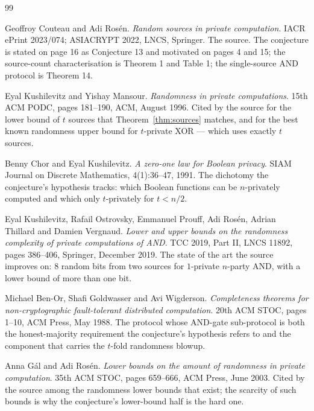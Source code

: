 \documentclass{aicr-conjecture}
\begin{document}
\begin{aicrbibliography}{99}

Geoffroy Couteau and Adi Ros\'en.
\emph{Random sources in private computation}.
IACR ePrint 2023/074; ASIACRYPT 2022, LNCS, Springer.
The source. The conjecture is stated on page 16 as Conjecture 13 and
motivated on pages 4 and 15; the source-count characterisation is
Theorem 1 and Table 1; the single-source AND protocol is Theorem 14.

Eyal Kushilevitz and Yishay Mansour.
\emph{Randomness in private computations}.
15th ACM PODC, pages 181--190, ACM, August 1996.
Cited by the source for the lower bound of $t$ sources that
Theorem~\ref{thm:sources} matches, and for the best known randomness
upper bound for $t$-private XOR --- which uses exactly $t$ sources.

Benny Chor and Eyal Kushilevitz.
\emph{A zero-one law for Boolean privacy}.
SIAM Journal on Discrete Mathematics, 4(1):36--47, 1991.
The dichotomy the conjecture's hypothesis tracks: which Boolean functions
can be $n$-privately computed and which only $t$-privately for $t < n/2$.

Eyal Kushilevitz, Rafail Ostrovsky, Emmanuel Prouff, Adi Ros\'en,
Adrian Thillard and Damien Vergnaud.
\emph{Lower and upper bounds on the randomness complexity of private
computations of AND}.
TCC 2019, Part II, LNCS 11892, pages 386--406, Springer, December 2019.
The state of the art the source improves on: $8$ random bits from two
sources for $1$-private $n$-party AND, with a lower bound of more than
one bit.

Michael Ben-Or, Shafi Goldwasser and Avi Wigderson.
\emph{Completeness theorems for non-cryptographic fault-tolerant
distributed computation}.
20th ACM STOC, pages 1--10, ACM Press, May 1988.
The protocol whose AND-gate sub-protocol is both the honest-majority
requirement the conjecture's hypothesis refers to and the component that
carries the $t$-fold randomness blowup.

Anna G\'al and Adi Ros\'en.
\emph{Lower bounds on the amount of randomness in private computation}.
35th ACM STOC, pages 659--666, ACM Press, June 2003.
Cited by the source among the randomness lower bounds that exist; the
scarcity of such bounds is why the conjecture's lower-bound half is the
hard one.

\end{aicrbibliography}
\end{document}
